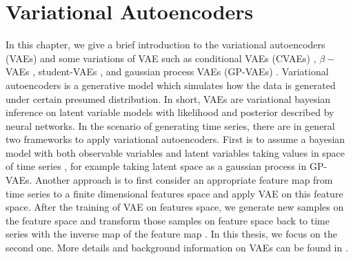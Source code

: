 \documentclass[12pt]{report}
\theoremstyle{definition}
\theoremstyle{remark}
\begin{document}
  
\chapter{Variational Autoencoders}\label{VariationalAutoencoders}
In this chapter, we give a brief introduction to the variational autoencoders (VAEs) \cite{kingma2013auto} and some variations of VAE such as conditional VAEs (CVAEs) \cite{sohn2015learning}, $\beta-$VAEs \cite{higgins2016beta}, student-VAEs \cite{abiri2020variational}, and gaussian process VAEs (GP-VAEs) \cite{fortuin2020gp}. Variational autoencoders is a generative model which simulates how the data is generated under certain presumed distribution. In short, VAEs are variational bayesian inference on latent variable models with likelihood and posterior described by neural networks. In the scenario of generating time series, there are in general two frameworks to apply variational autoencoders. First is to assume a bayesian model with both observable variables and latent variables taking values in space of time series \cite{fortuin2020gp} \cite{toth2020seq2tens}, for example taking latent space as a gaussian process in GP-VAEs. Another approach is to first consider an appropriate feature map from time series to a finite dimensional features space and apply VAE on this feature space. After the training of VAE on features space, we generate new samples on the feature space and transform those samples on feature space back to time series with the inverse map of the feature map \cite{buehler2020data}. In this thesis, we focus on the second one. More details and background information on VAEs can be found in \cite{kingma2019introduction}.
\end{document}
